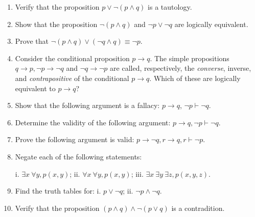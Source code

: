 \documentclass{article}
\begin{document}
\begin{enumerate}
  \item Verify that the proposition $p\lor \lnot (p\land q)$ is a tautology.

  \item Show that the proposition $\lnot(p \land q)$ and $\lnot p\lor \lnot q$ are logically equivalent.

  \item Prove that $\lnot (p \land q)\lor (\lnot q \land q)\equiv \lnot p$.

  \item Consider the conditional proposition $p\to q$. The simple propositions $q\to p, \lnot p \to \lnot q$
  and $\lnot q \to \lnot p$ are called, respectively, the \textsl{converse}, \textsf{inverse},
  and \textsl{contrapositive} of the conditional $p \to q$. Which of these are logically equivalent to $p \to q$?

  \item Show that the following argument is a fallacy: $p \to q$, $\lnot p \vdash \lnot q$.

  \item Determine the validity of the following argument: $p \to q, \lnot p \vdash \lnot q$.

  \item Prove the following argument is valid: $p \to \lnot q, r \to q, r\vdash \lnot p$.

  \item Negate each of the following statements:

  i. $\exists x\ \forall y, p(x, y)$;
  ii. $\forall x\ \forall y, p(x, y)$;
  iii. $\exists x\ \exists y\ \exists z, p(x, y, z)$.

  \item Find the truth tables for: i. $p\lor \lnot q$; ii. $\lnot p \land \lnot q$.
  \item Verify that the proposition $(p\land q)\land \lnot (p \lor q)$ is a contradition.
\end{enumerate}
\end{document}
